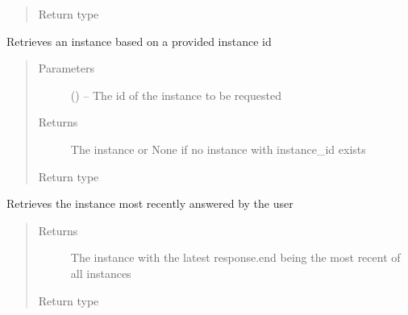 \documentclass[letterpaper,10pt,english]{sphinxmanual}
\begin{document}
\begin{fulllineitems}
\begin{fulllineitems}
\begin{quote}
\begin{description}
\item[{Return type}] \leavevmode
{\hyperref[\detokenize{instance:instance.Instance}]{}}

\end{description}\end{quote}

\end{fulllineitems}


\begin{fulllineitems}
\label{\detokenize{user:user.User.get_instance_by_id}}
Retrieves an instance based on a provided instance id
\begin{quote}\begin{description}
\item[{Parameters}] \leavevmode
{} () -- The id of the instance to be requested

\item[{Returns}] \leavevmode
The instance or None if no instance with instance\_id exists

\item[{Return type}] \leavevmode
{\hyperref[\detokenize{instance:instance.Instance}]{}}

\end{description}\end{quote}

\end{fulllineitems}


\begin{fulllineitems}
\label{\detokenize{user:user.User.retrieve_recent_instance}}
Retrieves the instance most recently answered by the user
\begin{quote}\begin{description}
\item[{Returns}] \leavevmode
The instance with the latest response.end being the most recent of all instances

\item[{Return type}] \leavevmode
{\hyperref[\detokenize{instance:module-instance}]{}}


\end{description}
\end{quote}
\end{fulllineitems}
\end{fulllineitems}
\end{document}
